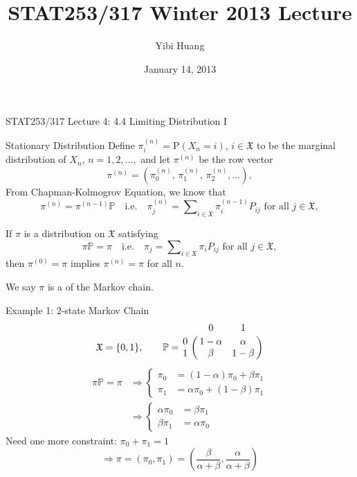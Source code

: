 \documentclass[letterpaper,handout]{beamer}
\title{STAT253/317 Winter 2013 Lecture \chapnum}
\date{January 14, 2013}
\author{Yibi Huang}
\def\P{\mathbb{P}}
\def\p{\mathrm P}
\def\Sum{\sum\nolimits}
\def\X{\mathfrak{X}}
\def\chapnum{4}
\begin{document}
\begin{frame}{STAT253/317 Lecture \chapnum: 4.4 Limiting Distribution I}

\begin{block}{Stationary Distribution}
Define $\pi^{(n)}_i=\p(X_n=i)$, $i\in\X$ to be the marginal distribution of $X_n$, $n=1,2,\ldots,$
and let $\pi^{(n)}$ be the row vector
$$
\pi^{(n)}=(\pi^{(n)}_0,\,\pi^{(n)}_1,\,\pi^{(n)}_2,\ldots),
$$
From Chapman-Kolmogrov Equation, we know that
$$\pi^{(n)}=\pi^{(n-1)}\P\quad\text{i.e.}\quad\pi^{(n)}_j=\Sum_{i\in\X}\pi^{(n-1)}_iP_{ij}\text{ for all }j\in\X,$$

If $\pi$ is a distribution on $\X$ satisfying
$$\pi\P=\pi\quad\text{i.e.}\quad\pi_j=\Sum_{i\in\X}\pi_iP_{ij}\text{ for all }j\in\X,$$
then $\pi^{(0)}=\pi$ implies $\pi^{(n)}=\pi$ for all $n$.\medskip

We say $\pi$ is a  of the Markov chain.
\end{block}
\end{frame}
\begin{frame}{Example 1: 2-state Markov Chain}
$$
\X = \{0, 1\},\qquad
\P=\bordermatrix{%
 & 0  & 1\cr
0& 1-\alpha  & \alpha\cr
1& \beta & 1-\beta\cr
}$$
\begin{align*}
\pi\P=\pi&\Rightarrow
\begin{cases}
\pi_0&=(1-\alpha)\pi_0+\beta\pi_1\\
\pi_1&=   \alpha \pi_0+(1-\beta)\pi_1
\end{cases}\\
&\Rightarrow
\begin{cases}
\alpha\pi_0&=\beta\pi_1\\
\beta \pi_1&=\alpha\pi_0
\end{cases}
\end{align*}
Need one more constraint: $\pi_0+\pi_1=1$
$$
\Rightarrow \pi=(\pi_0,\pi_1)=\left(\frac{\beta}{\alpha+\beta},\frac{\alpha}{\alpha+\beta}\right)
$$
\end{frame}
\end{document}
